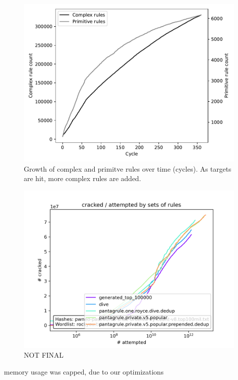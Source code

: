 \documentclass[letterpaper,twocolumn,10pt]{article}
\begin{document}
\begin{figure}
\includegraphics[width=\linewidth]
{analysis/passwords-analysis/stats-rules_composites_size.pdf}
\caption{Growth of complex and primitve rules over time (cycles). As targets
are hit, more complex rules are added. }
\label{fig:rule-count}
\end{figure}

\begin{figure}
    \includegraphics[width=\linewidth]
    {../cracked_attempted_plot_08318a9a-a503-11ed-9d73-005056c00001.png}
    \caption{NOT FINAL}
    \label{fig:cracked-attempted}
\end{figure}

memory usage was capped, due to our optimizations
\end{document}
